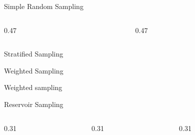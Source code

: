 \begin{frame}{Simple Random Sampling}
  \begin{columns}[T,onlytextwidth]
    \begin{column}{0.47\textwidth}
      \begin{tdblock}[equal height group=srs]
      \end{tdblock}
    \end{column}
    \begin{column}{0.47\textwidth}
      \begin{tdblock}[equal height group=srs]
      \end{tdblock}
    \end{column}
  \end{columns}
\end{frame}

\begin{frame}{Stratified Sampling}
  \begin{withmargin}
    \begin{tdmain}
    \end{tdmain}
    \begin{tdmargin}
    \end{tdmargin}
  \end{withmargin}
\end{frame}

\begin{frame}{Weighted Sampling}
  \begin{tdcodet}{Weighted sampling}
  \end{tdcodet}
\end{frame}

\begin{frame}{Reservoir Sampling}
  \begin{columns}[T,onlytextwidth]
    \begin{column}{0.31\textwidth}
      \begin{tdblock}[equal height group=resv]
      \end{tdblock}
    \end{column}
    \begin{column}{0.31\textwidth}
      \begin{tdblock}[equal height group=resv]
      \end{tdblock}
    \end{column}
    \begin{column}{0.31\textwidth}
      \begin{tdblock}[equal height group=resv]
      \end{tdblock}
    \end{column}
  \end{columns}
\end{frame}

